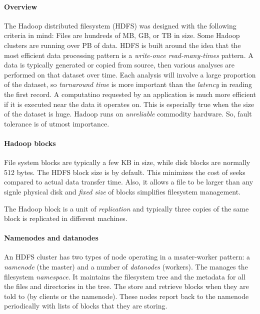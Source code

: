 \documentclass{memo}
\begin{document}
\small


\paragraph{Overview}
The Hadoop distributed filesystem (HDFS) was designed with the following
criteria in mind:
\bit
\w {} Files are hundreds of MB, GB, or TB in size. Some
Hadoop clusters are running over PB of data. 
\w {} HDFS is built around the idea that the most
efficient data processing pattern is a {\em write-once read-many-times\/}
pattern. A data is typically generated or copied from source, then various
analyses are performed on that dataset over time. Each analysis will involve a
large proportion of the dataset, so {\em turnaround time\/} is more important
than the {\em latency\/} in reading the first record.
\w {} A computatino requested
by an application is much more efficient if it is executed near the data it
operates on. This is especially true when the size of the dataset is huge. 
\w {} Hadoop runs on {\em unreliable\/} commodity
hardware. So, fault tolerance is of utmost importance.
\eit

\paragraph{Hadoop blocks}
File system blocks are typically a few KB in size, while disk blocks are
normally 512 bytes. 
The HDFS block size is  by default. This minimizes the cost of
seeks compared to actual data transfer time. Also, it allows a file to be
larger than any signle physical disk and {\em fixed size\/} of blocks
simplifies filesystem management.

The Hadoop block is a unit of {\em replication\/} and typically three copies
of the same block is replicated in different machines.

\paragraph{Namenodes and datanodes}
An HDFS cluster has two types of node operating in a msater-worker pattern: a
{\em namenode} (the master) and a number of {\em datanodes} (workers). 
The  manages the filesystem {\em namespace\/}. It maintains the
filesystem tree and the metadata for all the files and directories in the
tree. The  store and retrieve blocks when they are told to (by
clients or the namenode). These nodes report back to the namenode periodically
with lists of blocks that they are storing. 
\end{document}

